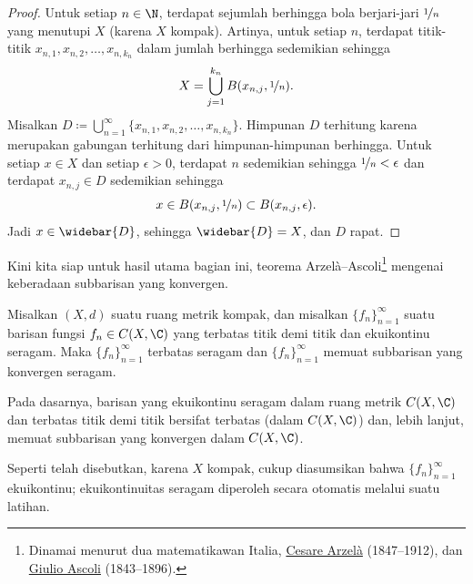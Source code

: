 \begin{proof}
Untuk setiap $n \in \N$, terdapat sejumlah berhingga
bola berjari-jari $\nicefrac{1}{n}$ yang menutupi $X$ (karena $X$ kompak). Artinya,
untuk setiap $n$, terdapat
titik-titik $x_{n,1},x_{n,2},\ldots,x_{n,k_n}$ dalam jumlah berhingga sedemikian sehingga
\begin{equation*}
X= \bigcup_{j=1}^{k_n} B(x_{n,j},\nicefrac{1}{n}) .
\end{equation*}
Misalkan $D \coloneqq \bigcup_{n=1}^\infty \{ x_{n,1},x_{n,2},\ldots,x_{n,k_n} \}$.
Himpunan $D$ terhitung karena merupakan gabungan terhitung dari himpunan-himpunan berhingga.
Untuk setiap $x \in X$
dan setiap $\epsilon > 0$, terdapat $n$ sedemikian sehingga
$\nicefrac{1}{n} < \epsilon$ dan terdapat $x_{n,j} \in D$ sedemikian sehingga
\begin{equation*}
x \in B(x_{n,j},\nicefrac{1}{n}) \subset B(x_{n,j},\epsilon) .
\end{equation*}
Jadi $x \in \widebar{D}$, sehingga $\widebar{D} = X$, dan $D$ rapat.
\end{proof}

Kini kita siap untuk hasil utama bagian ini,
teorema Arzel\`a--Ascoli\footnote{%
Dinamai menurut dua matematikawan Italia,
\href{https://en.wikipedia.org/wiki/Cesare_Arzel\%C3\%A0}{Cesare Arzel\`a}
(1847--1912), dan
\href{https://en.wikipedia.org/wiki/Giulio_Ascoli}{Giulio Ascoli}
(1843--1896).} mengenai keberadaan subbarisan yang konvergen.

\begin{thm}
\label{thm:arzelaascoli}
Misalkan $(X,d)$ suatu ruang metrik kompak, dan misalkan $\{ f_n \}_{n=1}^\infty$
suatu barisan fungsi $f_n \in C(X,\C)$ yang terbatas titik demi titik
dan ekuikontinu seragam.  Maka
$\{f_n\}_{n=1}^\infty$ terbatas seragam dan $\{ f_n \}_{n=1}^\infty$ memuat subbarisan yang
konvergen seragam.
\end{thm}

Pada dasarnya, barisan yang ekuikontinu seragam dalam ruang metrik
$C(X,\C)$ dan terbatas titik demi titik
bersifat terbatas (dalam $C(X,\C)$) dan, lebih lanjut, memuat subbarisan yang
konvergen dalam $C(X,\C)$.

Seperti telah disebutkan, karena $X$ kompak, cukup
diasumsikan bahwa $\{ f_n \}_{n=1}^\infty$ ekuikontinu;
ekuikontinuitas seragam diperoleh secara otomatis melalui suatu latihan.

